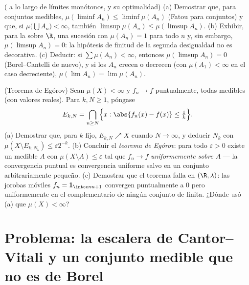 \begin{exercise}[$\star\star$]\label{exo:b3:measure:11}
( a lo largo de límites
monótonos, y su optimalidad) (a) Demostrar que, para conjuntos medibles,
$\mu(\liminf A_n) \leq
\liminf\mu(A_n)$ (Fatou para conjuntos) y que, si
$\mu\bigl(\bigcup A_n\bigr) < \infty$, también
$\limsup\mu(A_n) \leq \mu(\limsup A_n)$.
(b) Exhibir, para la  sobre $\R$, una sucesión con $\mu(A_n) = 1$ para todo $n$ y,
sin embargo, $\mu(\limsup A_n) = 0$: la hipótesis de finitud de la
segunda desigualdad no es decorativa. (c) Deducir: si
$\sum\mu(A_n) < \infty$, entonces $\mu(\limsup A_n) = 0$
(Borel--Cantelli de nuevo), y si los $A_n$ crecen o decrecen (con
$\mu(A_1) < \infty$ en el caso decreciente),
$\mu(\lim A_n) = \lim\mu(A_n)$.
\end{exercise}

\begin{exercise}[$\star\star\star$]\label{exo:b3:measure:12}
(Teorema de Egórov) Sean $\mu(X) < \infty$ y $f_n \to f$ puntualmente,
todas medibles (con valores reales). Para $k, N \geq 1$, póngase
\[
E_{k,N} = \bigcap_{n \geq N}\Bigl\{x : \abs{f_n(x) - f(x)}
\leq \tfrac1k\Bigr\} .
\]
(a) Demostrar que, para $k$ fijo, $E_{k,N} \nearrow X$ cuando $N \to
\infty$, y deducir $N_k$ con $\mu(X \setminus E_{k,N_k})
\leq \varepsilon2^{-k}$. (b) Concluir el \emph{teorema de Egórov}: para
todo $\varepsilon
> 0$ existe un medible $A$ con $\mu(X\setminus A) \leq
\varepsilon$ tal que $f_n \to f$ \emph{uniformemente sobre $A$} --- la
convergencia puntual es convergencia uniforme salvo en un conjunto
arbitrariamente pequeño. (c) Demostrar que el teorema falla en
$(\R, \lambda)$: las jorobas móviles $f_n = \mathbf 1_{\intcc n{n+1}}$
convergen puntualmente a $0$ pero uniformemente en el complementario de
ningún conjunto de  finita.
¿Dónde usó (a) que $\mu(X) < \infty$?
\end{exercise}

\section{Problema: la escalera de Cantor--Vitali y un
conjunto medible que no es de Borel}

